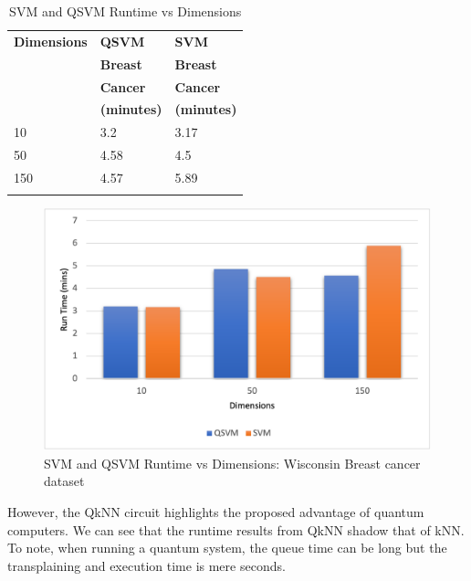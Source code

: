 \begin{table}
\caption{SVM and QSVM Runtime vs Dimensions}
\label{tab:treatments}
\centering
\begin{tabular}{l l l }
\toprule
\textbf{Dimensions} & \textbf{QSVM}& \textbf{SVM} \\
\textbf{} & 
\textbf{Breast} & \textbf{Breast}\\
\textbf{} & \textbf{Cancer}& \textbf{Cancer}\\
\textbf{} & \textbf{(minutes)}& \textbf{(minutes)}\\
\midrule
10 & 3.2 & 3.17 \\
50 & 4.58 & 4.5 \\
150 & 4.57 & 5.89 \\

\bottomrule\\
\end{tabular}
\normalsize
\end{table}

\begin{figure}[H]
      \centering
      \includegraphics[scale=0.8]{background/SVMRunT.png}
      \caption{SVM and QSVM Runtime vs Dimensions: Wisconsin Breast cancer dataset}
      \label{SVMRunT}
\end{figure}

However, the QkNN circuit highlights the proposed advantage of quantum computers. We can see that the runtime results from QkNN shadow that of kNN. To note, when running a quantum system, the queue time can be long but the transplaining and execution time is mere seconds. 
